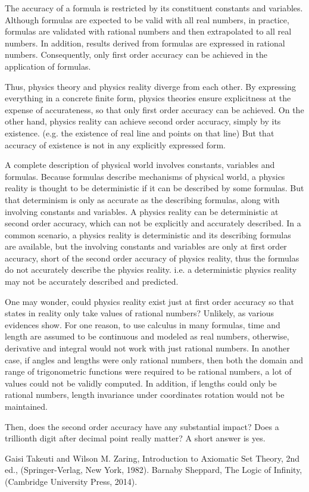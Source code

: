 \documentclass{amsart}
\theoremstyle{definition}
\theoremstyle{remark}
\numberwithin{equation}{section}
\begin{document}
The accuracy of a formula is restricted by its constituent constants and variables. Although formulas are expected to be valid with all real numbers, in practice, formulas are validated with rational numbers and then extrapolated to all real numbers. In addition, results derived from formulas are expressed in rational numbers. Consequently, only first order accuracy can be achieved in the application of formulas.

Thus, physics theory and physics reality diverge from each other. By expressing everything in a concrete finite form, physics theories ensure explicitness at the expense of accurateness, so that only first order accuracy can be achieved. On the other hand, physics reality can achieve second order accuracy, simply by its existence. (e.g. the existence of real line and points on that line) But that accuracy of existence is not in any explicitly expressed form.

A complete description of physical world involves constants, variables and formulas. Because formulas describe mechanisms of physical world, a physics reality is thought to be deterministic if it can be described by some formulas. But that determinism is only as accurate as the describing formulas, along with involving constants and variables. A physics reality can be deterministic at second order accuracy, which can not be explicitly and accurately described. In a common scenario, a physics reality is deterministic and its describing formulas are available, but the involving constants and variables are only at first order accuracy, short of the second order accuracy of physics reality, thus the formulas do not accurately describe the physics reality. i.e. a deterministic physics reality may not be accurately described and predicted.

One may wonder, could physics reality exist just at first order accuracy so that states in reality only take values of rational numbers? Unlikely, as various evidences show. For one reason, to use calculus in many formulas, time and length are assumed to be continuous and modeled as real numbers, otherwise, derivative and integral would not work with just rational numbers. In another case, if angles and lengths were only rational numbers, then both the domain and range of trigonometric functions were required to be rational numbers, a lot of values could not be validly computed. In addition, if lengths could only be rational numbers, length invariance under coordinates rotation would not be maintained.

Then, does the second order accuracy have any substantial impact? Does a trillionth digit after decimal point really matter? A short answer is yes.

\begin{thebibliography}{}
\label{sec:TeXbooks}
 Gaisi Takeuti and Wilson M. Zaring, Introduction to Axiomatic Set Theory, 2nd ed., (Springer-Verlag, New York, 1982).
 Barnaby Sheppard, The Logic of Infinity, (Cambridge University Press, 2014).
\end{thebibliography}
\end{document}

